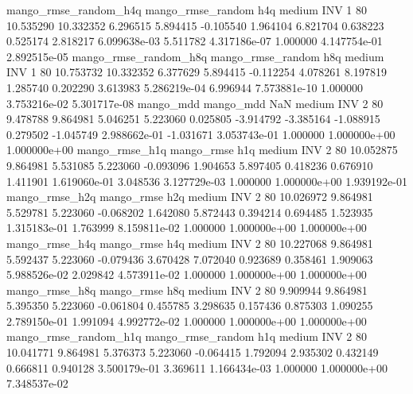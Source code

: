 mango_rmse_random_h4q mango_rmse_random                  h4q     medium      INV                 1 80 10.535290      10.332352 6.296515       5.894415   -0.105540      1.964104      6.821704     0.638223       0.525174  2.818217 6.099638e-03     5.511782   4.317186e-07            1.000000    4.147754e-01        2.892515e-05
mango_rmse_random_h8q mango_rmse_random                  h8q     medium      INV                 1 80 10.753732      10.332352 6.377629       5.894415   -0.112254      4.078261      8.197819     1.285740       0.202290  3.613983 5.286219e-04     6.996944   7.573881e-10            1.000000    3.753216e-02        5.301717e-08
            mango_mdd         mango_mdd                  NaN     medium      INV                 2 80  9.478788       9.864981 5.046251       5.223060    0.025805     -3.914792     -3.385164    -1.088915       0.279502 -1.045749 2.988662e-01    -1.031671   3.053743e-01            1.000000    1.000000e+00        1.000000e+00
       mango_rmse_h1q        mango_rmse                  h1q     medium      INV                 2 80 10.052875       9.864981 5.531085       5.223060   -0.093096      1.904653      5.897405     0.418236       0.676910  1.411901 1.619060e-01     3.048536   3.127729e-03            1.000000    1.000000e+00        1.939192e-01
       mango_rmse_h2q        mango_rmse                  h2q     medium      INV                 2 80 10.026972       9.864981 5.529781       5.223060   -0.068202      1.642080      5.872443     0.394214       0.694485  1.523935 1.315183e-01     1.763999   8.159811e-02            1.000000    1.000000e+00        1.000000e+00
       mango_rmse_h4q        mango_rmse                  h4q     medium      INV                 2 80 10.227068       9.864981 5.592437       5.223060   -0.079436      3.670428      7.072040     0.923689       0.358461  1.909063 5.988526e-02     2.029842   4.573911e-02            1.000000    1.000000e+00        1.000000e+00
       mango_rmse_h8q        mango_rmse                  h8q     medium      INV                 2 80  9.909944       9.864981 5.395350       5.223060   -0.061804      0.455785      3.298635     0.157436       0.875303  1.090255 2.789150e-01     1.991094   4.992772e-02            1.000000    1.000000e+00        1.000000e+00
mango_rmse_random_h1q mango_rmse_random                  h1q     medium      INV                 2 80 10.041771       9.864981 5.376373       5.223060   -0.064415      1.792094      2.935302     0.432149       0.666811  0.940128 3.500179e-01     3.369611   1.166434e-03            1.000000    1.000000e+00        7.348537e-02
